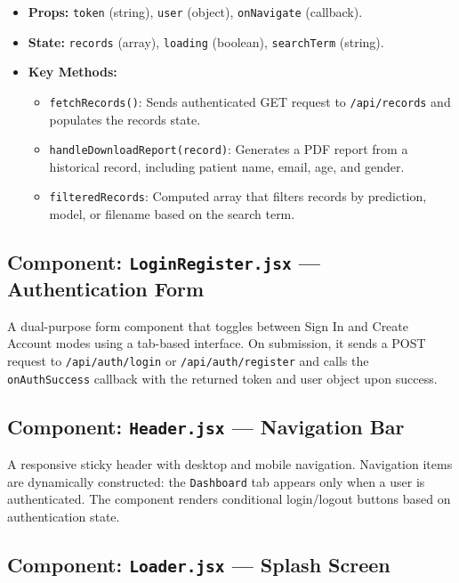 \documentclass[12pt, a4paper, oneside]{report}
\begin{document}
\begin{itemize}
    \item \textbf{Props:} \texttt{token} (string), \texttt{user} (object), \texttt{onNavigate} (callback).
    \item \textbf{State:} \texttt{records} (array), \texttt{loading} (boolean), \texttt{searchTerm} (string).
    \item \textbf{Key Methods:}
    \begin{itemize}
        \item \texttt{fetchRecords()}: Sends authenticated GET request to \texttt{/api/records} and populates the records state.
        \item \texttt{handleDownloadReport(record)}: Generates a PDF report from a historical record, including patient name, email, age, and gender.
        \item \texttt{filteredRecords}: Computed array that filters records by prediction, model, or filename based on the search term.
    \end{itemize}
\end{itemize}

\subsection{Component: \texttt{LoginRegister.jsx} --- Authentication Form}

A dual-purpose form component that toggles between Sign In and Create Account modes using a tab-based interface. On submission, it sends a POST request to \texttt{/api/auth/login} or \texttt{/api/auth/register} and calls the \texttt{onAuthSuccess} callback with the returned token and user object upon success.

\subsection{Component: \texttt{Header.jsx} --- Navigation Bar}

A responsive sticky header with desktop and mobile navigation. Navigation items are dynamically constructed: the \texttt{Dashboard} tab appears only when a user is authenticated. The component renders conditional login/logout buttons based on authentication state.

\subsection{Component: \texttt{Loader.jsx} --- Splash Screen}
\end{document}
